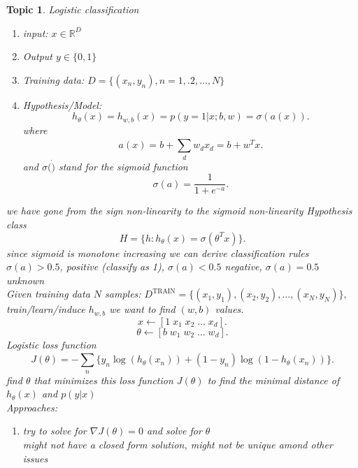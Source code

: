 \documentclass[a4paper,12pt]{scrartcl} %
\theoremstyle{darktheorem}
\newtheorem{topic}[theorem]{Topic}
\begin{document}
\begin{topic}
    Logistic classification\\
    \begin{enumerate}
        \item input: $x \in \mathbb{R}^{D}$ 
        \item Output $y \in \{0,1\}$ 
        \item Training data: $D = \{(x_n,y_n),n = 1,.2,\dots,N\}$
        \item Hypothesis/Model:
             \[
                 h_\theta(x) = h_{w,b}(x) = p(y=1|x;b,w) = \sigma(a(x))
            .\] 
            where
            \[
            a(x) = b + \sum_{d}^{}w_dx_d = b + w^{T}x
            .\] 
            and $\sigma(\dot)$ stand for the sigmoid function
            \[
            \sigma(a) = \frac{1}{1 + e^{-a}}
            .\] 
    \end{enumerate}
    we have gone from the sign non-linearity to the sigmoid non-linearity
    Hypothesis class
    \[
        H = \{h: h_\theta(x) = \sigma(\theta^{T}x)\}
    .\] 
    since sigmoid is monotone increasing we can derive classification rules
    $\sigma(a) > 0.5$, positive (classify as  1), $\sigma(a) < 0.5$ negative, $\sigma(a) = 0.5$ unknown\\
    Given training data $N$ samples:
    $D^{\text{TRAIN}} = \{(x_1,y_1),(x_2,y_2),\dots,(x_N,y_N)\},$ train/learn/induce $h_{w,b}$
    we want to find  $(w,b)$ values.
    \[
        x \leftarrow [1 \; x_1 \; x_2 \; \dots \; x_d]
    .\] 
    \[
        \theta \leftarrow [b \; w_1 \; w_2 \; \dots \; w_d]
    .\] 
    Logistic loss function
    \[
        J(\theta) = -\sum_{n}^{}\{y_n\log(h_\theta(x_n)) + (1-y_n)\log(1-h_\theta(x_n))\}
    .\] 
    find $\theta$ that minimizes this loss function $J(\theta)$ to find the minimal distance of $h_\theta(x)$ and $p(y|x)$\\
    Approaches:
    \begin{enumerate}
        \item try to solve for $\nabla J(\theta) = 0$ and solve for $\theta$\\
            might not have a closed form solution, might not be unique amond other issues
    \end{enumerate}

\end{topic}
\end{document}
